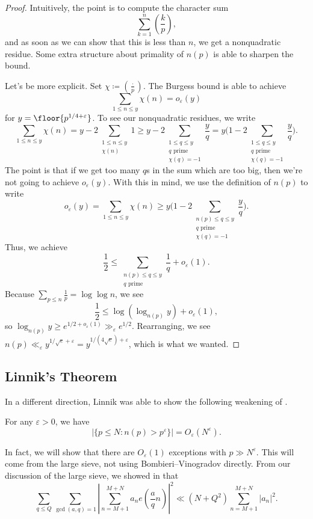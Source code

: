 \documentclass[../notes.tex]{subfiles}
\begin{document}
\begin{proof}
	Intuitively, the point is to compute the character sum
	\[\sum_{k=1}^n\left(\frac kp\right),\]
	and as soon as we can show that this is less than $n$, we get a nonquadratic residue. Some extra structure about primality of $n(p)$ is able to sharpen the bound.

	Let's be more explicit. Set $\chi\coloneqq\left(\frac\cdot p\right)$. The Burgess bound is able to achieve
	\[\sum_{1\le n\le y}\chi(n)=o_\varepsilon(y)\]
	for $y=\floor{p^{1/4+\varepsilon}}$. To see our nonquadratic residues, we write
	\[\sum_{1\le n\le y}\chi(n)=y-2\sum_{\substack{1\le n\le y\\\chi(n)}}1\ge y-2\sum_{\substack{1\le q\le y\\q\text{ prime}\\\chi(q)=-1}}\frac yq=y\Bigg(1-2\sum_{\substack{1\le q\le y\\q\text{ prime}\\\chi(q)=-1}}\frac yq\Bigg).\]
	The point is that if we get too many $q$s in the sum which are too big, then we're not going to achieve $o_\varepsilon(y)$. With this in mind, we use the definition of $n(p)$ to write
	\[o_\varepsilon(y)=\sum_{1\le n\le y}\chi(n)\ge y\Bigg(1-2\sum_{\substack{n(p)\le q\le y\\q\text{ prime}\\\chi(q)=-1}}\frac yq\Bigg).\]
	Thus, we achieve
	\[\frac12\le\sum_{\substack{n(p)\le q\le y\\q\text{ prime}}}\frac1q+o_\varepsilon(1).\]
	Because $\sum_{p\le n}\frac1p=\log\log n$, we see
	\[\frac12\le\log(\log_{n(p)}y)+o_\varepsilon(1),\]
	so $\log_{n(p)}y\ge e^{1/2+o_\varepsilon(1)}\gg_\varepsilon e^{1/2}$. Rearranging, we see $n(p)\ll_\varepsilon y^{1/\sqrt e+\varepsilon}=y^{1/(4\sqrt e)+\varepsilon}$, which is what we wanted.
\end{proof}

\subsection{Linnik's Theorem}
In a different direction, Linnik was able to show the following weakening of .
\begin{theorem}
	For any $\varepsilon>0$, we have
	\[\left|\{p\le N:n(p)>p^\varepsilon\}\right|=O_\varepsilon\left(N^\varepsilon\right).\]
\end{theorem}
In fact, we will show that there are $O_\varepsilon(1)$ exceptions with $p\gg N^\varepsilon$. This will come from the large sieve, not using Bombieri--Vinogradov directly. From our discussion of the large sieve, we showed in  that
\[\sum_{q\le Q}\sum_{\gcd(a,q)=1}\left|\sum_{n=M+1}^{M+N}a_ne\left(\frac aqn\right)\right|^2\ll\left(N+Q^2\right)\sum_{n=M+1}^{M+N}|a_n|^2.\]
\end{document}
